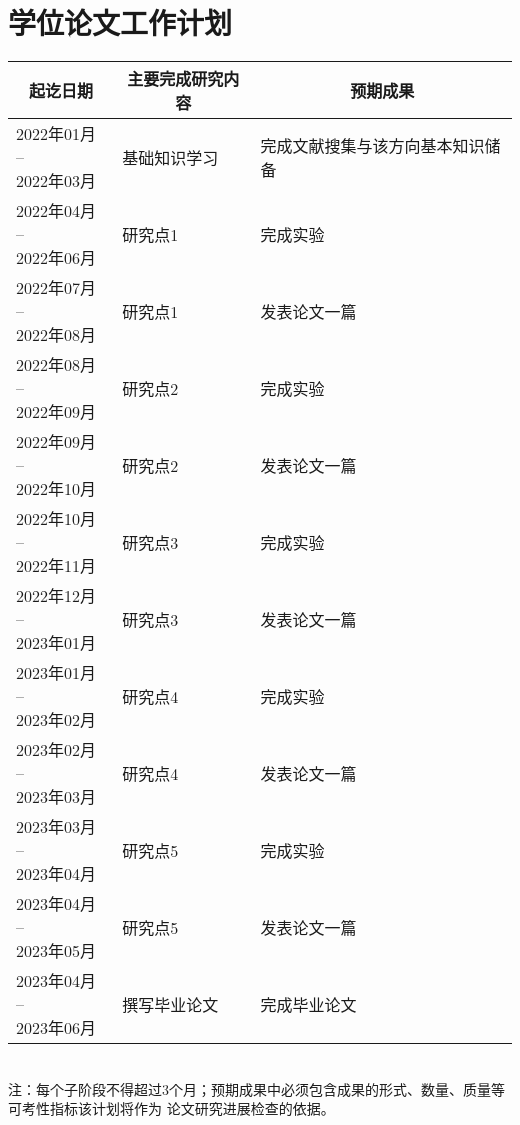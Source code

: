 



\section{学位论文工作计划}
{
\noindent
\begin{tabular*}{0.999\textwidth}{| p{ } <{\centering} | p{}  | p{}  |}

	\hline 
	\multicolumn{1}{|c|}{起讫日期} & 	\multicolumn{1}{c}{主要完成研究内容} & 	\multicolumn{1}{|c|}{预期成果} \\
	\hline 
	\tabincell{c}{2022年01月 -- \\2022年03月}   &  基础知识学习 &   完成文献搜集与该方向基本知识储备 \\ 
	\hline 
	\tabincell{c}{2022年04月 -- \\2022年06月} &  研究点1 &   完成实验 \\ 
	\hline 
	\tabincell{c}{2022年07月 -- \\2022年08月} &  研究点1 &   发表论文一篇 \\ 
	\hline 
	\tabincell{c}{2022年08月 -- \\2022年09月} &  研究点2 &   完成实验 \\ 
	\hline 
    \tabincell{c}{2022年09月 -- \\2022年10月} &  研究点2 &   发表论文一篇 \\ 
    \hline 
    \tabincell{c}{2022年10月 -- \\2022年11月} &  研究点3 &   完成实验 \\ 
    \hline 
    \tabincell{c}{2022年12月 -- \\2023年01月} &  研究点3 &   发表论文一篇 \\ 
    \hline 
    \tabincell{c}{2023年01月 -- \\2023年02月} &  研究点4 &   完成实验 \\ 
    \hline 
    \tabincell{c}{2023年02月 -- \\2023年03月} &  研究点4 &   发表论文一篇 \\ 
    \hline 
    \tabincell{c}{2023年03月 -- \\2023年04月} &  研究点5 &   完成实验 \\ 
    \hline 
    \tabincell{c}{2023年04月 -- \\2023年05月} &  研究点5 &   发表论文一篇 \\ 
    \hline 
	\tabincell{c}{2023年04月 -- \\2023年06月} &  撰写毕业论文 &  完成毕业论文 \\ 
	\hline 
\end{tabular*} 
\\[1 cm]
{\songti 注：每个子阶段不得超过3个月；预期成果中必须包含成果的形式、数量、质量等可考性指标该计划将作为
论文研究进展检查的依据。}
\indent
}


